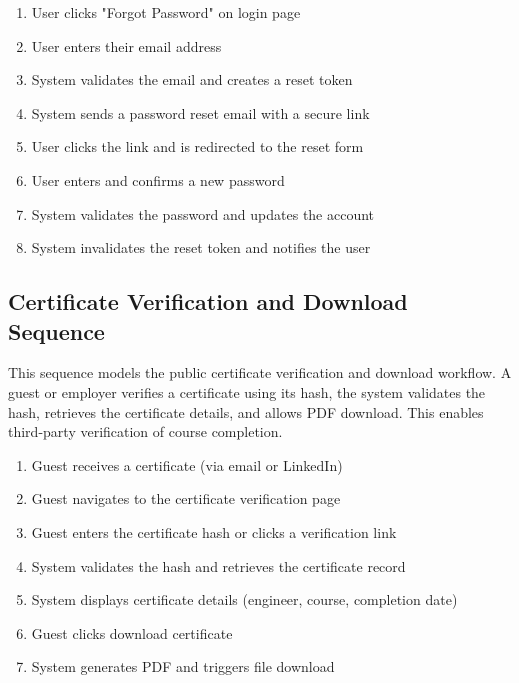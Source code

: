 \begin{enumerate}[topsep=0pt,itemsep=1pt,parsep=0pt,partopsep=0pt]
    \item User clicks "Forgot Password" on login page
    \item User enters their email address
    \item System validates the email and creates a reset token
    \item System sends a password reset email with a secure link
    \item User clicks the link and is redirected to the reset form
    \item User enters and confirms a new password
    \item System validates the password and updates the account
    \item System invalidates the reset token and notifies the user
\end{enumerate}

%

\subsection{Certificate Verification and Download Sequence}
This sequence models the public certificate verification and download workflow.
A guest or employer verifies a certificate using its hash, the system validates
the hash, retrieves the certificate details, and allows PDF download. This
enables third-party verification of course completion.

\begin{enumerate}[topsep=0pt,itemsep=1pt,parsep=0pt,partopsep=0pt]
    \item Guest receives a certificate (via email or LinkedIn)
    \item Guest navigates to the certificate verification page
    \item Guest enters the certificate hash or clicks a verification link
    \item System validates the hash and retrieves the certificate record
    \item System displays certificate details (engineer, course, completion date)
    \item Guest clicks download certificate
    \item System generates PDF and triggers file download
\end{enumerate}

